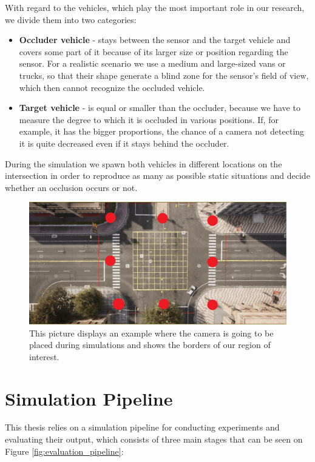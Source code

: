With regard to the vehicles, which play the most important role in our research, we divide them into two categories:

\begin{itemize}
    \item \textbf{Occluder vehicle} - stays between the sensor and the target vehicle and covers some part of it because of its larger size or position regarding the sensor. For a realistic scenario we use a medium and large-sized vans or trucks, so that their shape generate a blind zone for the sensor's field of view, which then cannot recognize the occluded vehicle. 
    \item \textbf{Target vehicle} - is equal or smaller than the occluder, because we have to measure the degree to which it is occluded in various positions. If, for example, it has the bigger proportions, the chance of a camera not detecting it is quite decreased even if it stays behind the occluder. 
\end{itemize}
During the simulation we spawn both vehicles in different locations on the intersection in order to reproduce as many as possible static situations and decide whether an occlusion occurs or not.

\begin{figure} [h]
    \centering
    \includegraphics[width=\textwidth]{images/junction.png}
    \caption[Camera experiment positions]{This picture displays an example where the camera is going to be placed during simulations and shows the borders of our region of interest.}
    \label{fig:camera_positions}
\end{figure}

\section{Simulation Pipeline} \label{sec:sim_pipeline}

This thesis relies on a simulation pipeline for conducting experiments and evaluating their output, which consists of three main stages that can be seen on Figure \ref{fig:evaluation_pipeline}: 

